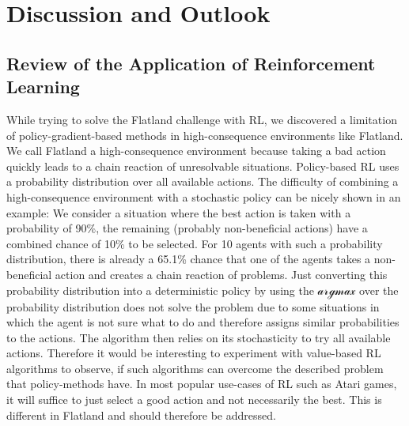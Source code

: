 %
%

\chapter{Discussion and Outlook}
\label{chap.diskussion}
\section{Review of the Application of Reinforcement Learning}\label{discussion_rl}
While trying to solve the Flatland challenge with RL, we discovered a limitation of policy-gradient-based methods in high-consequence environments like Flatland.
We call Flatland a high-consequence environment because taking a bad action quickly leads to a chain reaction of unresolvable situations. Policy-based RL uses a probability distribution over all available actions. The difficulty of combining a high-consequence environment with a stochastic policy can be nicely shown in an example: We consider a situation where the best action is taken with a probability of 90\%, the remaining (probably non-beneficial actions) have a combined chance of 10\% to be selected. For 10 agents with such a probability distribution, there is already a 65.1\% chance that one of the agents takes a non-beneficial action and creates a chain reaction of problems. Just converting this probability distribution into a deterministic policy by using the $\mathcal{argmax}$ over the probability distribution does not solve the problem due to some situations in which the agent is not sure what to do and therefore assigns similar probabilities to the actions. The algorithm then relies on its stochasticity to try all available actions. Therefore it would be interesting to experiment with value-based RL algorithms to observe, if such algorithms can overcome the described problem that policy-methods have. In most popular use-cases of RL such as Atari games, it will suffice to just select a good action and not necessarily the best. This is different in Flatland and should therefore be addressed.

